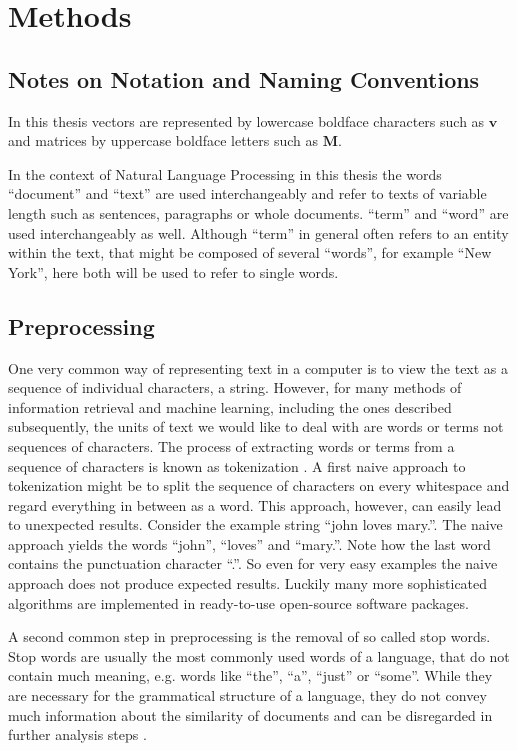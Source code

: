 \documentclass[Thesis.tex]{subfiles}
\begin{document}
\chapter{Methods}
\label{ch:methods}

\section{Notes on Notation and Naming Conventions}

In this thesis vectors are represented by lowercase boldface characters
such as $\mathbf{v}$ and matrices by uppercase boldface letters such
as $\mathbf{M}$. 

In the context of Natural Language Processing in this thesis the words ``document''
and ``text'' are used interchangeably and refer to texts of variable
length such as sentences, paragraphs or whole documents. ``term''
and ``word'' are used interchangeably as well. Although ``term'' in general
often refers to an entity within the text, that might be
composed of several ``words'', for example ``New York'', here both will be used to refer to single words.


\section{Preprocessing}

One very common way of representing text in a computer is to view
the text as a sequence of individual characters, a string. However,
for many methods of information retrieval and machine learning, including
the ones described subsequently, the units of text we would like to
deal with are words or terms not sequences of characters. The process
of extracting words or terms from a sequence of characters is known
as tokenization \citep{Manning2008prepr}. A first naive approach to tokenization might be to
split the sequence of characters on every whitespace and regard everything
in between as a word. This approach, however, can easily lead to unexpected
results. Consider the example string ``john loves mary.''. The naive
approach yields the words ``john'', ``loves'' and ``mary.''.
Note how the last word contains the punctuation character ``.''.
So even for very easy examples the naive approach does not produce
expected results. Luckily many more sophisticated algorithms are implemented
in ready-to-use open-source software packages.

A second common step in preprocessing is the removal of so called
stop words. Stop words are usually the most commonly used words of
a language, that do not contain much meaning, e.g. words like ``the'',
``a'', ``just'' or ``some''. While they are necessary for the
grammatical structure of a language, they do not convey much information
about the similarity of documents and can be disregarded in further
analysis steps \citep{Manning2008prepr}.
\end{document}
